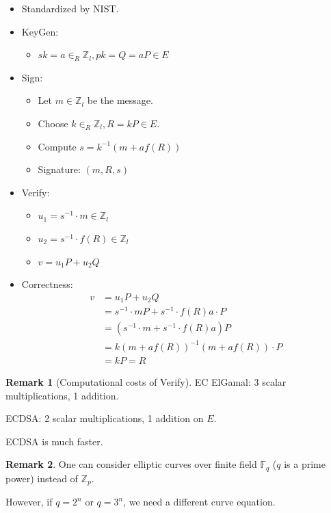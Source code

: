 \documentclass[11pt]{article}
\theoremstyle{definition}
\newtheorem{remark}{Remark}[section]
\theoremstyle{proof}
\begin{document}
\begin{itemize}
	\item Standardized by NIST.
	\item KeyGen:
	\begin{itemize}
		\item $sk = a \in_R \mathbb{Z}_l, pk = Q = aP \in E$
	\end{itemize}
	\item Sign:
	\begin{itemize}
		\item Let $m \in \mathbb{Z}_l$ be the message.
		\item Choose $k \in_R \mathbb{Z}_l, R = kP \in E$.
		\item Compute $s = k^{-1} (m + af(R))$
		\item Signature: $(m, R, s)$
	\end{itemize}
	\item Verify:
	\begin{itemize}
		\item $u_1 = s^{-1} \cdot m \in \mathbb{Z}_l$
		\item $u_2 = s^{-1} \cdot f(R) \in \mathbb{Z}_l$
		\item $v = u_1 P + u_2 Q$
	\end{itemize}
	\item Correctness:
	\begin{align}
		v &= u_1 P + u_2 Q \\
		&= s^{-1} \cdot mP + s^{-1} \cdot f(R)a \cdot P \\
		&= (s^{-1} \cdot m + s^{-1} \cdot f(R)a) P \\
		&= k (m + af(R))^{-1} (m + a f(R)) \cdot P \\
		&= kP = R
	\end{align}
\end{itemize}

\begin{remark}[Computational costs of Verify]
	\leavevmode

	EC ElGamal: 3 scalar multiplications, 1 addition.
	
	ECDSA: 2 scalar multiplications, 1 addition on $E$.
	
	ECDSA is much faster.
\end{remark}

\begin{remark}
	One can consider elliptic curves over finite field $\mathbb{F}_q$ ($q$ is a prime power) instead of $\mathbb{Z}_p$.
	
	However, if $q = 2^n$ or $q = 3^n$, we need a different curve equation.
\end{remark}
\end{document}
